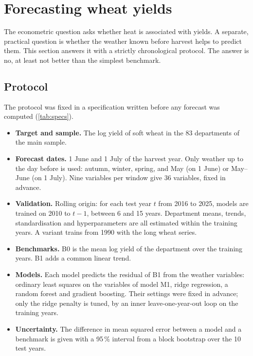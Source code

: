 \section{Forecasting wheat yields}
\label{sec:forecasting}

The econometric question asks whether heat is associated with yields. A separate, practical question is whether the weather known before harvest helps to predict them. This section answers it with a strictly chronological protocol. The answer is no, at least not better than the simplest benchmark.

\subsection{Protocol}

The protocol was fixed in a specification written before any forecast was computed (\cref{tab:specs}).
\begin{itemize}
  \item \textbf{Target and sample.} The log yield of soft wheat in the 83 departments of the main sample.
  \item \textbf{Forecast dates.} 1 June and 1 July of the harvest year. Only weather up to the day before is used: autumn, winter, spring, and May (on 1 June) or May--June (on 1 July). Nine variables per window give 36 variables, fixed in advance.
  \item \textbf{Validation.} Rolling origin: for each test year $t$ from 2016 to 2025, models are trained on 2010 to $t-1$, between 6 and 15 years. Department means, trends, standardisation and hyperparameters are all estimated within the training years. A variant trains from 1990 with the long wheat series.
  \item \textbf{Benchmarks.} B0 is the mean log yield of the department over the training years. B1 adds a common linear trend.
  \item \textbf{Models.} Each model predicts the residual of B1 from the weather variables: ordinary least squares on the variables of model M1, ridge regression, a random forest and gradient boosting. Their settings were fixed in advance; only the ridge penalty is tuned, by an inner leave-one-year-out loop on the training years.
  \item \textbf{Uncertainty.} The difference in mean squared error between a model and a benchmark is given with a 95\,\% interval from a block bootstrap over the 10 test years.
\end{itemize}

